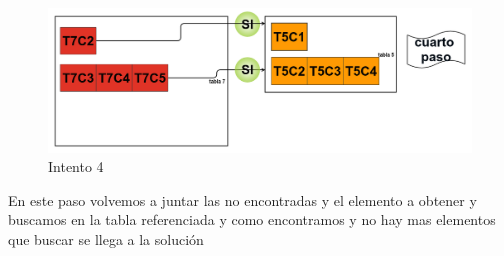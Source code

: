 \begin{figure}[H]
\centering
\includegraphics[scale=0.35]{images/paso4.png}
\caption{Intento 4}\label{intento4}
\end{figure}
En este paso volvemos a juntar las no encontradas y el elemento a obtener y buscamos en la tabla referenciada y como encontramos y no hay mas elementos que buscar se llega a la soluci\'on